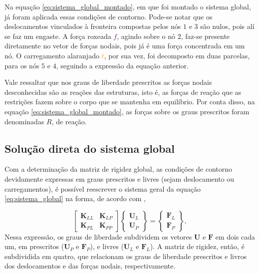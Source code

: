 Na equação \ref{eq:sistema_global_montado}, em que foi montado o sistema global, já foram aplicada essas condições de contorno. Pode-se notar que os deslocamentos vinculados à fronteira compostas pelos nós $1$ e $3$ são nulos, pois alí se faz um engaste. A força roxeada \textcolor{purple}{$f$}, agindo sobre o nó $2$, faz-se presente diretamente no vetor de forças nodais, pois já é uma força concentrada em um nó. O carregamento alaranjado \textcolor{orange}{$t$}, por sua vez, foi decomposto em duas parcelas, para os nós $5$ e $4$, seguindo a expressão da equação anterior. 

Vale ressaltar que nos graus de liberdade prescritos as forças nodais desconhecidas são as reações das estruturas, isto é, as forças de reação que as restrições fazem sobre o corpo que se mantenha em equilíbrio. Por conta disso, na equação \ref{eq:sistema_global_montado}, as forças sobre os graus prescritos foram denominadas $R$, de reação.

\subsection{Solução direta do sistema global}

Com a determinação da matriz de rigidez global, as condições de contorno devidamente expressas em graus prescritos e livres (sejam deslocamento ou carregamentos), é possível reescrever o sistema geral da equação \ref{eq:sistema_global} na forma, de acordo com ,

\begin{equation}
    \begin{bmatrix}
        \bm{K}_{LL} & \bm{K}_{LP} \\
        \bm{K}_{PL} & \bm{K}_{PP}
    \end{bmatrix} 
    \begin{Bmatrix}
        \bm{U}_L \\ \bm{U}_P
    \end{Bmatrix}
    = \begin{Bmatrix}
        \bm{F}_L \\ \bm{F}_P
    \end{Bmatrix},
\end{equation}
Nessa expressão, os graus de liberdade subdividem os vetores $\bm{U}$ e $\bm{F}$ em dois cada um, em prescritos ($\bm{U}_P$ e $\bm{F}_P$), e livres ($\bm{U}_L$ e $\bm{F}_L$). A matriz de rigidez, então, é subdividida em quatro, que relacionam os graus de liberdade prescritos e livros dos deslocamentos e das forças nodais, respectivamente.


